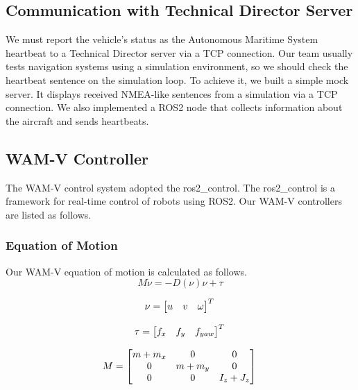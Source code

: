 \documentclass[lettersize,journal]{IEEEtran}
\begin{document}
\subsection{Communication with Technical Director Server}
We must report the vehicle's status as the Autonomous Maritime System heartbeat to a Technical Director server via a TCP connection. 
Our team usually tests navigation systems using a simulation environment, 
so we should check the heartbeat sentence on the simulation loop. 
To achieve it, we built a simple mock server\cite{robotx_communication}.
It displays received NMEA-like sentences from a simulation via a TCP connection.
We also implemented a ROS2 node that collects information about the aircraft and sends heartbeats.

\subsection{WAM-V Controller}
The WAM-V control system adopted the ros2\_control\cite{ros2_control,wamv_control}.
The ros2\_control is a framework for real-time control of robots using ROS2.
Our WAM-V controllers are listed as follows.
\subsubsection{Equation of Motion}
Our WAM-V equation of motion is calculated as follows.
\begin{equation}
  M \dot\nu = -D(\nu)\nu + \tau
\end{equation}

\begin{equation}
  \nu = 
  \begin{bmatrix}
  u & v & \omega \\
  \end{bmatrix}^T\\
  \label{eq:control_1}
\end{equation}

\begin{equation}
\tau = 
\begin{bmatrix}
f_x & f_y & f_{yaw} \\
\end{bmatrix}^T\\
\end{equation}

\begin{equation}
M = 
\begin{bmatrix}
m+m_x &  0 & 0 \\
0 & m+m_y & 0 \\
0 & 0 & I_z + J_z
\end{bmatrix}\\
\end{equation}
\end{document}
